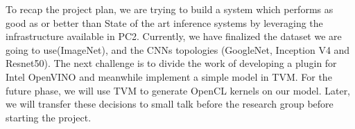 \documentclass[titlepage]{report}
\begin{document}
To recap the project plan, we are trying to build a system which performs as good as or better than State of the art inference systems by leveraging the infrastructure available in PC2. Currently, we have finalized the dataset we are going to use(ImageNet), and the CNNs topologies (GoogleNet, Inception V4 and Resnet50). The next challenge is to divide the work of developing a plugin for Intel OpenVINO and meanwhile implement a simple model in TVM. For the future phase, we will use TVM to generate OpenCL kernels on our model. Later, we will transfer these decisions to small talk before the research group before starting the project.

\end{document}

